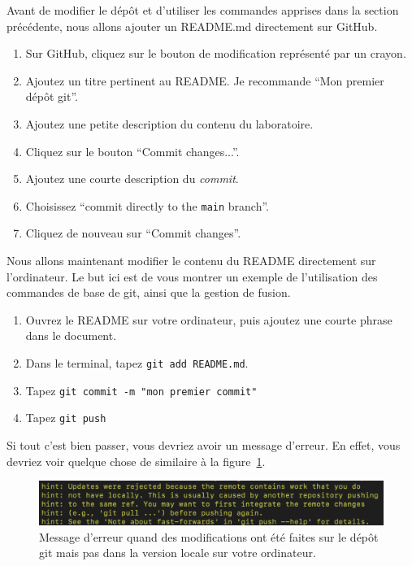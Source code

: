 \documentclass{book}
\newenvironment{myexampleblock}[1]{%
    \tcolorbox[beamer,%
    noparskip,breakable,
    colback=LightGreen,colframe=DarkGreen,%
    colbacklower=LimeGreen!75!LightGreen,%
    title={#1}, width=\textwidth]}%
    {\endtcolorbox}
\begin{document}
Avant de modifier le dépôt et d'utiliser les commandes apprises dans la section précédente, nous allons ajouter un README.md directement sur GitHub.

\begin{myexampleblock}{Exercice : Modifier le README sur GitHub}
\begin{enumerate}
        \item Sur GitHub, cliquez sur le bouton de modification représenté par un crayon. 
        \item Ajoutez un titre pertinent au README. Je recommande ``Mon premier dépôt git''.
        \item Ajoutez une petite description du contenu du laboratoire.
        \item Cliquez sur le bouton ``Commit changes...''.
        \item Ajoutez une courte description du \emph{commit}.
        \item Choisissez ``commit directly to the \texttt{main} branch''.
        \item Cliquez de nouveau sur ``Commit changes''.
\end{enumerate}
\end{myexampleblock}

Nous allons maintenant modifier le contenu du README directement sur l'ordinateur. Le but ici est de vous montrer un exemple de l'utilisation des commandes de base de git, ainsi que la gestion de fusion.
\begin{myexampleblock}{Exercice : Modifier le README dans le dépôt local}
    \begin{enumerate}
        \item Ouvrez le README sur votre ordinateur, puis ajoutez une courte phrase dans le document. 
        \item Dans le terminal, tapez \texttt{git add README.md}.
        \item Tapez \texttt{git commit -m "mon premier commit"}
        \item Tapez \texttt{git push}
    \end{enumerate}
\end{myexampleblock}

Si tout c'est bien passer, vous devriez avoir un message d'erreur. En effet, vous devriez voir quelque chose de similaire à la figure~\ref{fig:erreur_push_git}.
\begin{figure}[!h]
    \centering
    \includegraphics[width=\textwidth]{images/erreur_push_git.png}
    \caption{Message d'erreur quand des modifications ont été faites sur le dépôt git mais pas dans la version locale sur votre ordinateur.}\label{fig:erreur_push_git}
\end{figure}
\end{document}
